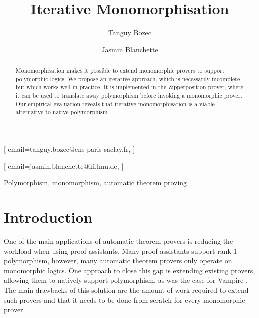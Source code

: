 \documentclass[]{ceurart}
\begin{document}



\title{Iterative Monomorphisation}

\author[1,2]{Tanguy Bozec}[%
email=tanguy.bozec@ens-paris-saclay.fr,
]
\author[2]{Jasmin Blanchette}[%
email=jasmin.blanchette@ifi.lmu.de,
]
\address[1]{ENS Paris-Saclay, Université Paris-Saclay, France}
\address[2]{Institute of Informatics, Ludwig-Maximilians-Universität München, Germany}


\begin{abstract}
Monomorphisation makes it possible to extend monomorphic provers to support polymorphic logics. We propose an iterative approach, which is necessarily incomplete but which works well in practice. It is implemented in the Zipperposition prover, where it can be used to translate away polymorphism before invoking a monomorphic prover. Our empirical evaluation reveals that iterative monomorphisation is a viable alternative to native polymorphism.
\end{abstract}

\begin{keywords}
   Polymorphism\sep
   monomorphism\sep
   automatic theorem proving
\end{keywords}

\maketitle

\section{Introduction}


One of the main applications of automatic theorem provers is reducing the workload when using proof assistants. Many proof assistants support rank-1 polymorphism, however, many automatic theorem provers only operate on monomorphic logics. One approach to close this gap is extending existing provers, allowing them to natively support polymorphism, as was the case for Vampire \cite{vamp}. The main drawbacks of this solution are the amount of work required to extend such provers and that it needs to be done from scratch for every monomorphic prover.
\end{document}
